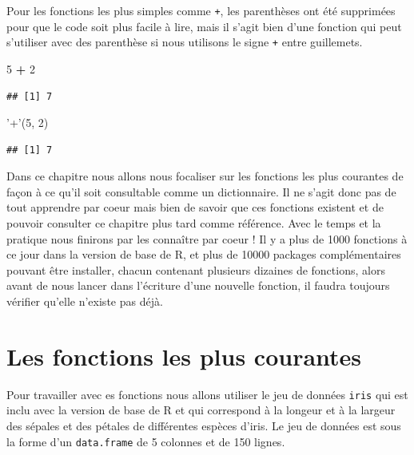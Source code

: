 \documentclass[]{book}
\makeatletter
\newenvironment{Shaded}{\begin{snugshade}}{\end{snugshade}}
\newcommand{\DecValTok}[1]{\textcolor[rgb]{0.00,0.00,0.81}{#1}}
\newcommand{\StringTok}[1]{\textcolor[rgb]{0.31,0.60,0.02}{#1}}
\newcommand{\OperatorTok}[1]{\textcolor[rgb]{0.81,0.36,0.00}{\textbf{#1}}}
\newcommand{\NormalTok}[1]{#1}
\newenvironment{kframe}{%
\medskip{}
\setlength{\fboxsep}{.8em}
 \def\at@end@of@kframe{}%
 \ifinner\ifhmode%
  \def\at@end@of@kframe{\end{minipage}}%
  \begin{minipage}{\columnwidth}%
 \fi\fi%
 \def\FrameCommand##1{\hskip\@totalleftmargin \hskip-\fboxsep
 \colorbox{shadecolor}{##1}\hskip-\fboxsep
     \hskip-\linewidth \hskip-\@totalleftmargin \hskip\columnwidth}%
 \MakeFramed {\advance\hsize-\width
   \@totalleftmargin\z@ \linewidth\hsize
   \@setminipage}}%
 {\par\unskip\endMakeFramed%
 \at@end@of@kframe}
\newenvironment{rmdblock}[1]
  {
  \begin{itemize}
  \renewcommand{\labelitemi}{
    \raisebox{-.7\height}[0pt][0pt]{
      {\setkeys{Gin}{width=3em,keepaspectratio}\texttt{[image: myIcons/\#1]}} %
    }
  }
  \setlength{\fboxsep}{1em}
  \begin{kframe}
  \item
  }
  {
  \end{kframe}
  \end{itemize}
  }
\newenvironment{rmdnote}      %
  {\begin{rmdblock}{note}}    %
  {\end{rmdblock}}            %
\makeatother
\begin{document}
\begin{rmdnote}
Pour les fonctions les plus simples comme \texttt{+}, les parenthèses
ont été supprimées pour que le code soit plus facile à lire, mais il
s'agit bien d'une fonction qui peut s'utiliser avec des parenthèse si
nous utilisons le signe \texttt{+} entre guillemets.
\end{rmdnote}

\begin{Shaded}
\begin{Highlighting}[]
\DecValTok{5} \OperatorTok{+}\StringTok{ }\DecValTok{2}
\end{Highlighting}
\end{Shaded}

\begin{verbatim}
## [1] 7
\end{verbatim}

\begin{Shaded}
\begin{Highlighting}[]
\StringTok{'+'}\NormalTok{(}\DecValTok{5}\NormalTok{, }\DecValTok{2}\NormalTok{)}
\end{Highlighting}
\end{Shaded}

\begin{verbatim}
## [1] 7
\end{verbatim}

Dans ce chapitre nous allons nous focaliser sur les fonctions les plus
courantes de façon à ce qu'il soit consultable comme un dictionnaire. Il
ne s'agit donc pas de tout apprendre par coeur mais bien de savoir que
ces fonctions existent et de pouvoir consulter ce chapitre plus tard
comme référence. Avec le temps et la pratique nous finirons par les
connaître par coeur ! Il y a plus de 1000 fonctions à ce jour dans la
version de base de R, et plus de 10000 packages complémentaires pouvant
être installer, chacun contenant plusieurs dizaines de fonctions, alors
avant de nous lancer dans l'écriture d'une nouvelle fonction, il faudra
toujours vérifier qu'elle n'existe pas déjà.

\section{Les fonctions les plus
courantes}\label{les-fonctions-les-plus-courantes}

Pour travailler avec es fonctions nous allons utiliser le jeu de données
\texttt{iris} qui est inclu avec la version de base de R et qui
correspond à la longeur et à la largeur des sépales et des pétales de
différentes espèces d'iris. Le jeu de données est sous la forme d'un
\texttt{data.frame} de 5 colonnes et de 150 lignes.
\end{document}

